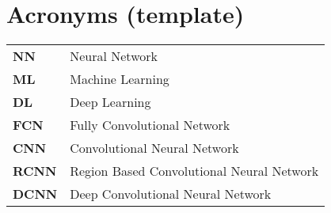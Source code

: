 \chapter*{\centering Acronyms (template)}
\begin{spacing}{1.5}
\setlength{\parskip}{0.3in}

\begin{table}[ht]
\centering
\begin{tabular}{ll}
\textbf{NN} & Neural Network \\
\textbf{ML} & Machine Learning \\
\textbf{DL} & Deep Learning \\
\textbf{FCN} & Fully Convolutional Network \\
\textbf{CNN} & Convolutional Neural Network \\
\textbf{RCNN} & Region Based Convolutional Neural Network \\
\textbf{DCNN} & Deep Convolutional Neural Network
\end{tabular}%
\end{table}

\end{spacing}
\newpage
